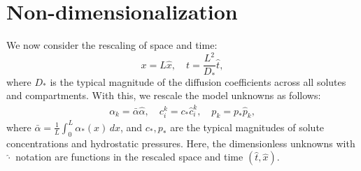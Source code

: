 \documentclass{article}
\begin{document}
\section{Non-dimensionalization}

We now consider the rescaling of space and time:
\begin{equation}
    x = L\hat{x},\quad t = \frac{L^2}{D_*}\hat{t},
\end{equation}
    where $D_*$ is the typical magnitude of the diffusion coefficients across all solutes and compartments.
With this, we rescale the model unknowns as follows:
\begin{gather}
    \alpha_k = \bar{\alpha}\hat{\alpha},\quad c_i^k = c_*\hat{c}_i^k,\quad p_k = p_*\hat{p}_k,
\end{gather}
    where $\bar{\alpha} = \frac{1}{L}\int_0^L\alpha_*(x)\,dx$, and $c_*,p_*$ are the typical magnitudes of solute concentrations and hydrostatic pressures.
Here, the dimensionless unknowns with $\hat{\cdot}$ notation are functions in the rescaled space and time $(\hat{t},\hat{x})$.
\end{document}
